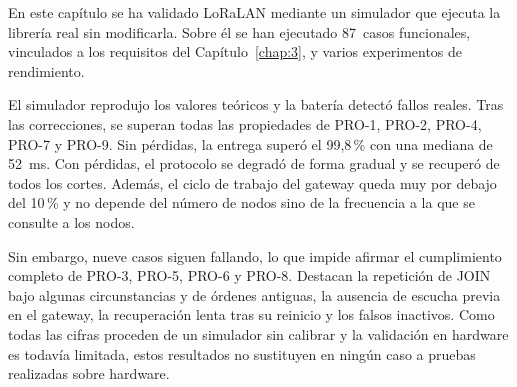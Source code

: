 En este capítulo se ha validado LoRaLAN mediante un simulador que ejecuta la librería real sin modificarla. Sobre él se han ejecutado 87~casos funcionales, vinculados a los requisitos del Capítulo~\ref{chap:3}, y varios experimentos de rendimiento.

El simulador reprodujo los valores teóricos y la batería detectó fallos reales. Tras las correcciones, se superan todas las propiedades de PRO-1, PRO-2, PRO-4, PRO-7 y PRO-9. Sin pérdidas, la entrega superó el 99,8\,\% con una mediana de 52~ms. Con pérdidas, el protocolo se degradó de forma gradual y se recuperó de todos los cortes. Además, el ciclo de trabajo del gateway queda muy por debajo del 10\,\% y no depende del número de nodos sino de la frecuencia a la que se consulte a los nodos.

Sin embargo, nueve casos siguen fallando, lo que impide afirmar el cumplimiento completo de PRO-3, PRO-5, PRO-6 y PRO-8. Destacan la repetición de JOIN bajo algunas circunstancias y de órdenes antiguas, la ausencia de escucha previa en el gateway, la recuperación lenta tras su reinicio y los falsos inactivos. Como todas las cifras proceden de un simulador sin calibrar y la validación en hardware es todavía limitada, estos resultados no sustituyen en ningún caso a pruebas realizadas sobre hardware.